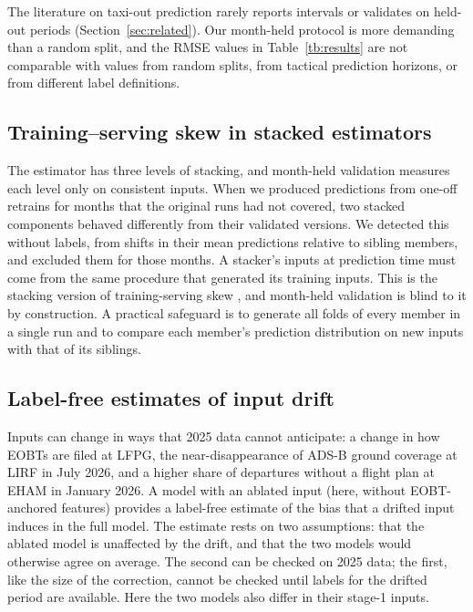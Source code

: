 \documentclass[
  manuscript=article,  %
  layout=preprint,  %
  year=20xx,
  volume=x,
]{extra/joas}
\begin{document}
The literature on taxi-out prediction rarely reports intervals or validates on held-out periods (Section~\ref{sec:related}). Our month-held protocol is more demanding than a random split, and the RMSE values in Table~\ref{tb:results} are not comparable with values from random splits, from tactical prediction horizons, or from different label definitions.

\subsection{Training--serving skew in stacked estimators}

The estimator has three levels of stacking, and month-held validation measures each level only on consistent inputs. When we produced predictions from one-off retrains for months that the original runs had not covered, two stacked components behaved differently from their validated versions. We detected this without labels, from shifts in their mean predictions relative to sibling members, and excluded them for those months. A stacker's inputs at prediction time must come from the same procedure that generated its training inputs. This is the stacking version of training-serving skew \cite{breck2017ml,sculley2015hidden}, and month-held validation is blind to it by construction. A practical safeguard is to generate all folds of every member in a single run and to compare each member's prediction distribution on new inputs with that of its siblings.

\subsection{Label-free estimates of input drift}

Inputs can change in ways that 2025 data cannot anticipate: a change in how EOBTs are filed at LFPG, the near-disappearance of ADS-B ground coverage at LIRF in July 2026, and a higher share of departures without a flight plan at EHAM in January 2026. A model with an ablated input (here, without EOBT-anchored features) provides a label-free estimate of the bias that a drifted input induces in the full model. The estimate rests on two assumptions: that the ablated model is unaffected by the drift, and that the two models would otherwise agree on average. The second can be checked on 2025 data; the first, like the size of the correction, cannot be checked until labels for the drifted period are available. Here the two models also differ in their stage-1 inputs.
\end{document}
